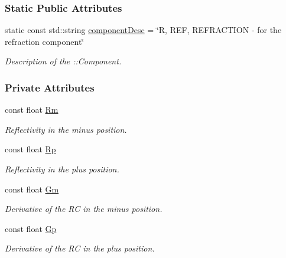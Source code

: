 \subsubsection*{Static Public Attributes}
\begin{DoxyCompactItemize}
\item 
static const std::string \hyperlink{group__deiedei_ga8bd9c912b09462c1a300a6b4d1201392}{componentDesc} = \char`\"{}R, REF, REFRACTION -\/ for the refraction component\char`\"{}
\begin{DoxyCompactList}\small\item\em Description of the ::Component. \item\end{DoxyCompactList}\end{DoxyCompactItemize}
\subsubsection*{Private Attributes}
\begin{DoxyCompactItemize}
\item 
const float \hyperlink{classDEIprocess_a0fa7581497fa2c98fd05bc4f5522f05b}{Rm}
\begin{DoxyCompactList}\small\item\em Reflectivity in the minus position. \item\end{DoxyCompactList}\item 
const float \hyperlink{classDEIprocess_af2c92e524735fd9632468b8bc3a0023f}{Rp}
\begin{DoxyCompactList}\small\item\em Reflectivity in the plus position. \item\end{DoxyCompactList}\item 
const float \hyperlink{classDEIprocess_a769738a97b0bb4ff0e378d1818ce288f}{Gm}
\begin{DoxyCompactList}\small\item\em Derivative of the RC in the minus position. \item\end{DoxyCompactList}\item 
const float \hyperlink{classDEIprocess_ae63dfc36be988c4bdbdf914377139cf0}{Gp}
\begin{DoxyCompactList}\small\item\em Derivative of the RC in the plus position. \item\end{DoxyCompactList}\end{DoxyCompactItemize}

